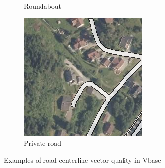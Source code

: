 \begin{figure}[h]
\begin{subfigure}{0.31\textwidth}
\caption{Roundabout} \label{fig:norwegian_roads_roundabout_vbase}
\end{subfigure}
\hspace*{\fill} %
\begin{subfigure}{0.31\textwidth}
\includegraphics[width=\linewidth]{figs/datasets/nor_examples/1157_missing_vbase.png}
\caption{Private road} \label{fig:norwegian_roads_missing_vbase}
\end{subfigure}
\hspace*{\fill} %
\caption{Examples of road centerline vector quality in Vbase} \label{fig:norwegian_roads_examples_vbase}
\end{figure}

